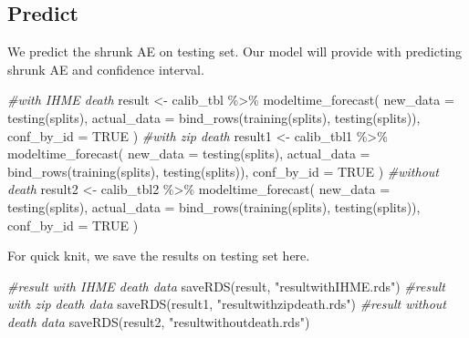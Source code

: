 \documentclass[
]{article}
\newenvironment{Shaded}{\begin{snugshade}}{\end{snugshade}}
\newcommand{\AttributeTok}[1]{\textcolor[rgb]{0.77,0.63,0.00}{#1}}
\newcommand{\CommentTok}[1]{\textcolor[rgb]{0.56,0.35,0.01}{\textit{#1}}}
\newcommand{\ConstantTok}[1]{\textcolor[rgb]{0.00,0.00,0.00}{#1}}
\newcommand{\FunctionTok}[1]{\textcolor[rgb]{0.00,0.00,0.00}{#1}}
\newcommand{\NormalTok}[1]{#1}
\newcommand{\OtherTok}[1]{\textcolor[rgb]{0.56,0.35,0.01}{#1}}
\newcommand{\SpecialCharTok}[1]{\textcolor[rgb]{0.00,0.00,0.00}{#1}}
\newcommand{\StringTok}[1]{\textcolor[rgb]{0.31,0.60,0.02}{#1}}
\begin{document}
\hypertarget{predict}{%
\subsection{Predict}\label{predict}}

We predict the shrunk AE on testing set. Our model will provide with
predicting shrunk AE and confidence interval.

\begin{Shaded}
\begin{Highlighting}[]
\CommentTok{\#with IHME death}
\NormalTok{result }\OtherTok{\textless{}{-}}\NormalTok{ calib\_tbl }\SpecialCharTok{\%\textgreater{}\%}
    \FunctionTok{modeltime\_forecast}\NormalTok{(}
        \AttributeTok{new\_data    =} \FunctionTok{testing}\NormalTok{(splits),}
        \AttributeTok{actual\_data =} \FunctionTok{bind\_rows}\NormalTok{(}\FunctionTok{training}\NormalTok{(splits), }\FunctionTok{testing}\NormalTok{(splits)),}
        \AttributeTok{conf\_by\_id  =} \ConstantTok{TRUE}
\NormalTok{    )}
\CommentTok{\#with zip death}
\NormalTok{result1 }\OtherTok{\textless{}{-}}\NormalTok{ calib\_tbl1 }\SpecialCharTok{\%\textgreater{}\%}
    \FunctionTok{modeltime\_forecast}\NormalTok{(}
        \AttributeTok{new\_data    =} \FunctionTok{testing}\NormalTok{(splits),}
        \AttributeTok{actual\_data =} \FunctionTok{bind\_rows}\NormalTok{(}\FunctionTok{training}\NormalTok{(splits), }\FunctionTok{testing}\NormalTok{(splits)),}
        \AttributeTok{conf\_by\_id  =} \ConstantTok{TRUE}
\NormalTok{    )}
\CommentTok{\#without death}
\NormalTok{result2 }\OtherTok{\textless{}{-}}\NormalTok{ calib\_tbl2 }\SpecialCharTok{\%\textgreater{}\%}
    \FunctionTok{modeltime\_forecast}\NormalTok{(}
        \AttributeTok{new\_data    =} \FunctionTok{testing}\NormalTok{(splits),}
        \AttributeTok{actual\_data =} \FunctionTok{bind\_rows}\NormalTok{(}\FunctionTok{training}\NormalTok{(splits), }\FunctionTok{testing}\NormalTok{(splits)),}
        \AttributeTok{conf\_by\_id  =} \ConstantTok{TRUE}
\NormalTok{    )}
\end{Highlighting}
\end{Shaded}

For quick knit, we save the results on testing set here.

\begin{Shaded}
\begin{Highlighting}[]
\CommentTok{\#result with IHME death data }
\FunctionTok{saveRDS}\NormalTok{(result, }\StringTok{"resultwithIHME.rds"}\NormalTok{)}
\CommentTok{\#result with zip death data}
\FunctionTok{saveRDS}\NormalTok{(result1, }\StringTok{"resultwithzipdeath.rds"}\NormalTok{)}
\CommentTok{\#result without death data}
\FunctionTok{saveRDS}\NormalTok{(result2, }\StringTok{"resultwithoutdeath.rds"}\NormalTok{)}
\end{Highlighting}
\end{Shaded}
\end{document}
